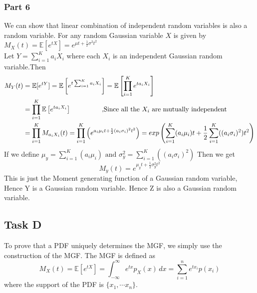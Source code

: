 \subsubsection{Part 6}
    We can show that linear combination of independent random variables is also a random variable. For any random Gaussian variable $X$ is given by $M_X(t)=\mathbb{E}[e^{tX}]=e^{\mu t+\frac{1}{2} \sigma^2t^2}$\\
    Let $Y=\sum_{i=1}^K a_i X_i$ where each $X_i$ is an independent Gaussian random variable.Then 
    \begin{align*}
        M_Y(t) &= \mathbb{E}[e^{tY}]= \mathbb{E}\left[e^{t\sum_{i=1}^K a_i X_i}\right] = \mathbb{E}\left[\prod_{i=1}^Ke^{ta_i X_i}\right]\\
        &=\prod_{i=1}^K\mathbb{E}\left[e^{ta_i X_i}\right] \hspace{15mm} \text{ ,Since all the $X_i$ are mutually independent}\\
        &= \prod_{i=1}^KM_{a_iX_i}(t) =\prod_{i=1}^K\left(  e^{a_i\mu_i t+\frac{1}{2} (a_i\sigma_i)^2t^2}\right) = exp\left({\sum_{i=1}^K(a_i\mu_i) t+\frac{1}{2} \sum_{i=1}^K((a_i\sigma_i)^2)t^2}\right)\\
    \end{align*}
    If we define $\mu_y = \sum_{i=1}^K(a_i\mu_i)\text{ and }\sigma_y^2 = \sum_{i=1}^K((a_i\sigma_i)^2)$ Then we get 
    \begin{equation}
        M_y(t) = e^{\mu_y t+\frac{1}{2} \sigma_y^2t^2}
    \end{equation}
    This is just the Moment generating function of a Gaussian random variable, Hence Y is a Gaussian random variable. Hence Z is also a Gaussian random variable.
\subsection{Task D}
To prove that a PDF uniquely determines the MGF, we simply use the construction of the MGF. The MGF is defined as
\[
M_X(t) = \mathbb{E}[e^{tX}] = \int_{-\infty}^{\infty} e^{tx} p_X(x) \, dx = \sum_{i=1}^n e^{tx_i} p(x_i)
\]
where the support of the PDF is $\{x_1,\cdots x_n\}$.\\

